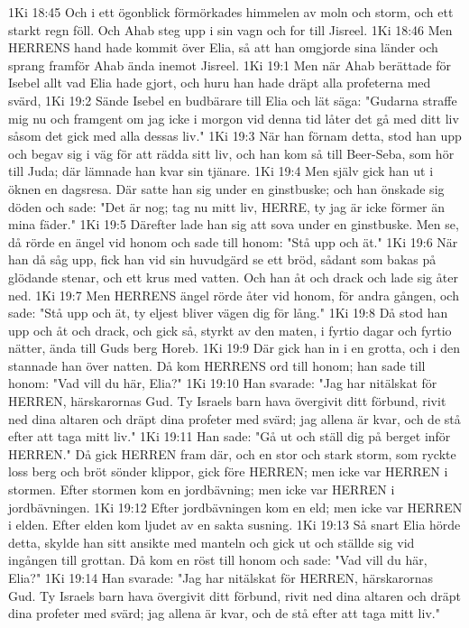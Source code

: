 1Ki 18:45  Och i ett ögonblick förmörkades himmelen av moln och storm, och ett starkt regn föll. Och Ahab steg upp i sin vagn och for till Jisreel.
1Ki 18:46  Men HERRENS hand hade kommit över Elia, så att han omgjorde sina länder och sprang framför Ahab ända inemot Jisreel.
1Ki 19:1  Men när Ahab berättade för Isebel allt vad Elia hade gjort, och huru han hade dräpt alla profeterna med svärd,
1Ki 19:2  Sände Isebel en budbärare till Elia och lät säga: "Gudarna straffe mig nu och framgent om jag icke i morgon vid denna tid låter det gå med ditt liv såsom det gick med alla dessas liv."
1Ki 19:3  När han förnam detta, stod han upp och begav sig i väg för att rädda sitt liv, och han kom så till Beer-Seba, som hör till Juda; där lämnade han kvar sin tjänare.
1Ki 19:4  Men själv gick han ut i öknen en dagsresa. Där satte han sig under en ginstbuske; och han önskade sig döden och sade: "Det är nog; tag nu mitt liv, HERRE, ty jag är icke förmer än mina fäder."
1Ki 19:5  Därefter lade han sig att sova under en ginstbuske. Men se, då rörde en ängel vid honom och sade till honom: "Stå upp och ät."
1Ki 19:6  När han då såg upp, fick han vid sin huvudgärd se ett bröd, sådant som bakas på glödande stenar, och ett krus med vatten. Och han åt och drack och lade sig åter ned.
1Ki 19:7  Men HERRENS ängel rörde åter vid honom, för andra gången, och sade: "Stå upp och ät, ty eljest bliver vägen dig för lång."
1Ki 19:8  Då stod han upp och åt och drack, och gick så, styrkt av den maten, i fyrtio dagar och fyrtio nätter, ända till Guds berg Horeb.
1Ki 19:9  Där gick han in i en grotta, och i den stannade han över natten. Då kom HERRENS ord till honom; han sade till honom: "Vad vill du här, Elia?"
1Ki 19:10  Han svarade: "Jag har nitälskat för HERREN, härskarornas Gud. Ty Israels barn hava övergivit ditt förbund, rivit ned dina altaren och dräpt dina profeter med svärd; jag allena är kvar, och de stå efter att taga mitt liv."
1Ki 19:11  Han sade: "Gå ut och ställ dig på berget inför HERREN." Då gick HERREN fram där, och en stor och stark storm, som ryckte loss berg och bröt sönder klippor, gick före HERREN; men icke var HERREN i stormen. Efter stormen kom en jordbävning; men icke var HERREN i jordbävningen.
1Ki 19:12  Efter jordbävningen kom en eld; men icke var HERREN i elden. Efter elden kom ljudet av en sakta susning.
1Ki 19:13  Så snart Elia hörde detta, skylde han sitt ansikte med manteln och gick ut och ställde sig vid ingången till grottan. Då kom en röst till honom och sade: "Vad vill du här, Elia?"
1Ki 19:14  Han svarade: "Jag har nitälskat för HERREN, härskarornas Gud. Ty Israels barn hava övergivit ditt förbund, rivit ned dina altaren och dräpt dina profeter med svärd; jag allena är kvar, och de stå efter att taga mitt liv."
